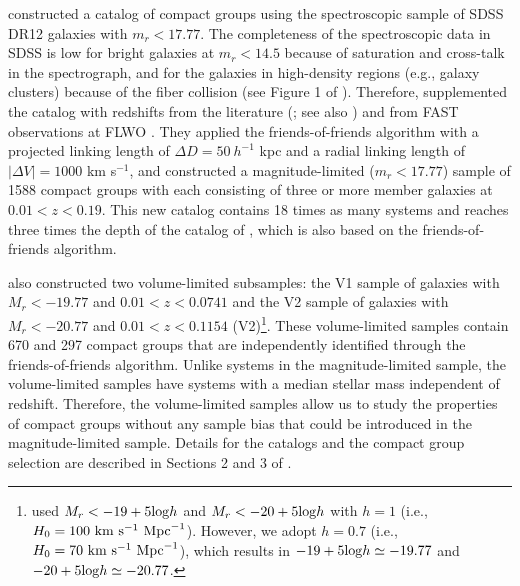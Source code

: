\documentclass[12pt,preprint,apj]{emulateapj}
\newcommand{\kms}{{\rm km~s^{-1}}}
\begin{document}
\citet{sohn+16} constructed a catalog of compact groups using 
the spectroscopic sample of SDSS DR12 galaxies with $m_r < 17.77$. 
The completeness of the spectroscopic data in SDSS is low for bright galaxies 
at $m_r < 14.5$ because of saturation and cross-talk in 
the spectrograph, and for the galaxies in high-density regions 
(e.g., galaxy clusters) because of the fiber collision (see Figure 1 of \citealt{park+09}).
Therefore, \citet{sohn+16} supplemented the catalog with redshifts 
from the literature
(\citealt{hill+93,hill+98,wegner+96,wegner+99,slinglend+98,falco+99}; see also 
\citealt{hwang+10}) and from FAST observations at FLWO \citep{sohn+15}. 
They applied the friends-of-friends algorithm 
with a projected linking length of $\Delta D = 50~h^{-1}$ kpc and 
a radial linking length of $| \Delta V | = 1000$ km s$^{-1}$, 
and constructed a magnitude-limited ($m_r<17.77$) sample of 1588 compact 
groups with each consisting of three or more member galaxies at $0.01<z<0.19$. 
This new catalog contains 18 times as many systems and reaches three times 
the depth of the catalog of \citet{barton+96}, which is also based on 
the friends-of-friends algorithm.

\citet{sohn+16} also constructed two volume-limited 
subsamples: the V1 sample of galaxies with $M_r<-19.77$ and 
$0.01<z<0.0741$ and the V2 sample of galaxies with $M_r<-20.77$ 
and $0.01<z<0.1154$ (V2)\footnote{
\citet{sohn+16} used $M_r<-19+5{\rm log}h$ 
and $M_r<-20+5{\rm log}h$ with 
$h=1$ (i.e., $H_0=100~\kms~{\rm Mpc}^{-1}$). However, we adopt 
$h=0.7$ (i.e., $H_0=70~\kms~{\rm Mpc}^{-1}$), 
which results in $-19+5{\rm log}h\simeq-19.77$ and 
$-20+5{\rm log}h\simeq-20.77$.}.
These volume-limited samples contain 670 and 297 compact groups 
that are independently identified through the friends-of-friends algorithm. 
Unlike systems in the magnitude-limited sample, the volume-limited samples
have systems with a median stellar mass independent of redshift. 
Therefore, the volume-limited samples allow us to study the properties of 
compact groups without any sample bias that could be introduced 
in the magnitude-limited sample.
Details for the catalogs and the compact group selection 
are described in Sections 2 and 3 of \citet{sohn+16}.
\end{document}
